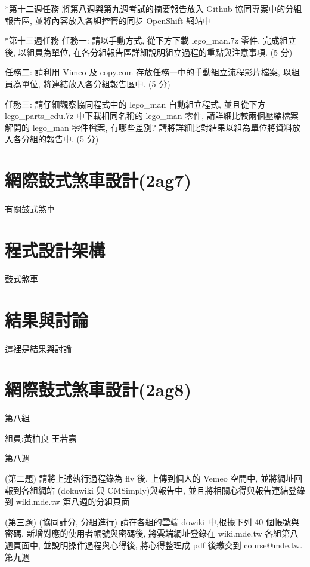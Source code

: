 \documentclass[]{article}
\begin{document}
*第十二週任務 將第八週與第九週考試的摘要報告放入 Github
協同專案中的分組報告區, 並將內容放入各組控管的同步 OpenShift 網站中

*第十三週任務 任務一: 請以手動方式, 從下方下載 lego\_man.7z 零件,
完成組立後, 以組員為單位,
在各分組報告區詳細說明組立過程的重點與注意事項. (5 分)

任務二: 請利用 Vimeo 及 copy.com 存放任務一中的手動組立流程影片檔案,
以組員為單位, 將連結放入各分組報告區中. (5 分)

任務三: 請仔細觀察協同程式中的 lego\_man 自動組立程式, 並且從下方
lego\_parts\_edu.7z 中下載相同名稱的 lego\_man 零件,
請詳細比較兩個壓縮檔案解開的 lego\_man 零件檔案, 有哪些差別?
請將詳細比對結果以組為單位將資料放入各分組的報告中. (5 分)

\section{網際鼓式煞車設計(2ag7)}\label{ux7db2ux969bux9f13ux5f0fux715eux8ecaux8a2dux8a082ag7}

有關鼓式煞車

\section{程式設計架構}\label{ux7a0bux5f0fux8a2dux8a08ux67b6ux69cb-1}

鼓式煞車

\section{結果與討論}\label{ux7d50ux679cux8207ux8a0eux8ad6-1}

這裡是結果與討論

\section{網際鼓式煞車設計(2ag8)}\label{ux7db2ux969bux9f13ux5f0fux715eux8ecaux8a2dux8a082ag8}

第八組

組員:黃柏良 王若嘉

第八週

(第二題) 請將上述執行過程錄為 flv 後, 上傳到個人的 Vemeo 空間中,
並將網址回報到各組網站 (dokuwiki 與 CMSimply)與報告中,
並且將相關心得與報告連結登錄到 wiki.mde.tw 第八週的分組頁面

(第三題) (協同計分, 分組進行) 請在各組的雲端 dowiki 中,根據下列 40
個帳號與密碼, 新增對應的使用者帳號與密碼後, 將雲端網址登錄在 wiki.mde.tw
各組第八週頁面中, 並說明操作過程與心得後, 將心得整理成 pdf 後繳交到
course@mde.tw. 第九週
\end{document}
